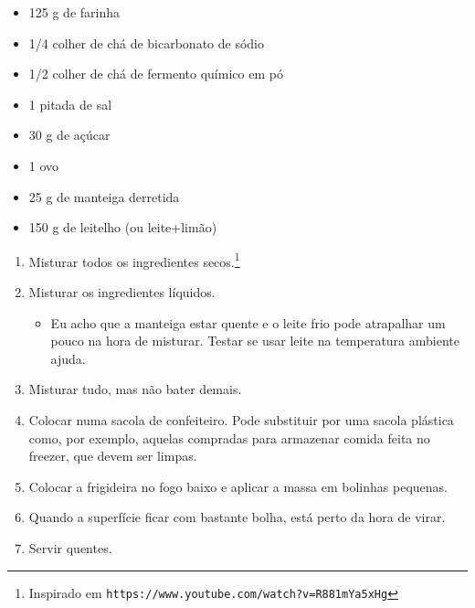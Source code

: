{
	\begin{itemize}
    \item 125 g de farinha
		\item 1/4 colher de chá de bicarbonato de sódio
		\item 1/2 colher de chá de fermento químico em pó
		\item 1 pitada de sal
		\item 30 g de açúcar
		\item 1 ovo
		\item 25 g de manteiga derretida
		\item 150 g de leitelho (ou leite+limão)
	\end{itemize}
}{
	\begin{enumerate}
  \item Misturar todos os ingredientes secos.\footnote{Inspirado em \texttt{https://www.youtube.com/watch?v=R881mYa5xHg}}
		\item Misturar os ingredientes líquidos.
		      \begin{itemize}
			      \item Eu acho que a manteiga estar quente e o leite frio pode atrapalhar um pouco na hora de misturar.
			            Testar se usar leite na temperatura ambiente ajuda.
		      \end{itemize}
		\item Misturar tudo, mas não bater demais.
		\item Colocar numa sacola de confeiteiro. Pode substituir por uma sacola plástica como, por exemplo, aquelas
		      compradas para armazenar comida feita no freezer, que devem ser limpas.
		\item Colocar a frigideira no fogo baixo e aplicar a massa em bolinhas pequenas.
		\item Quando a superfície ficar com bastante bolha, está perto da hora de virar.
		\item Servir quentes.
	\end{enumerate}
}